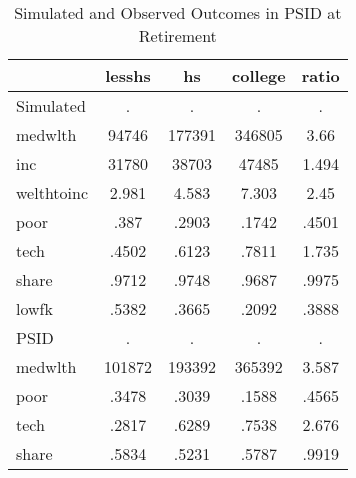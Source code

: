 \begin{table}[htbp]
\caption{\label{clabel} Simulated and Observed Outcomes in PSID at Retirement}\centering\medskip
\begin{tabular}{lcccc} \hline \hline
 & lesshs  & hs  & college  & ratio  \\  \hline 
Simulated &         . &         . &         . &         . \\  
medwlth &     94746 &    177391 &    346805 &      3.66 \\  
inc &     31780 &     38703 &     47485 &     1.494 \\  
welthtoinc &     2.981 &     4.583 &     7.303 &      2.45 \\  
poor &      .387 &     .2903 &     .1742 &     .4501 \\  
tech &     .4502 &     .6123 &     .7811 &     1.735 \\  
share &     .9712 &     .9748 &     .9687 &     .9975 \\  
lowfk &     .5382 &     .3665 &     .2092 &     .3888 \\  
PSID &         . &         . &         . &         . \\  
medwlth &    101872 &    193392 &    365392 &     3.587 \\  
poor &     .3478 &     .3039 &     .1588 &     .4565 \\  
tech &     .2817 &     .6289 &     .7538 &     2.676 \\  
share &     .5834 &     .5231 &     .5787 &     .9919 \\  
\hline \hline \end{tabular}
\end{table}
